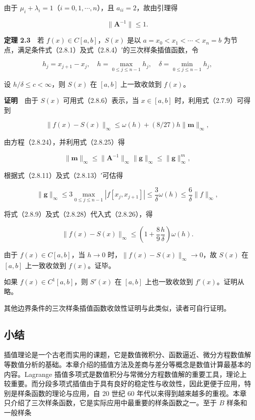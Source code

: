 \documentclass[
  10pt,
  fontset=fandol]{ctexart}
\begin{document}
由于 \(\mu_i+\lambda_i=1\)（\(i=0,1,\cdots,n\)），且 \(a_{ii}=2\)，故由引理得

\[\|\boldsymbol A^{-1}\|\leqslant1.\tag{2.8.25}\]

\textbf{定理 2.3}　若 \(f(x)\in C[a,b]\)，\(S(x)\) 是以 \(a=x_0<x_1<\cdots<x_n=b\) 为节点，满足条件式（2.8.1）及式（2.8.4）′的三次样条插值函数，令

\[h_j=x_{j+1}-x_j,\quad h=\max_{0\leqslant j\leqslant n-1}h_j,\quad\delta=\min_{0\leqslant j\leqslant n-1}h_j,\]

设 \(h/\delta\leqslant c<\infty\)，则 \(S(x)\) 在 \([a,b]\) 上一致收敛到 \(f(x)\)。

\textbf{证明}　由于 \(S(x)\) 可用式（2.8.6）表示，当 \(x\in[a,b]\) 时，利用式（2.7.9）可得到

\[\|f(x)-S(x)\|_\infty\leqslant\omega(h)+(8/27)h\|\boldsymbol m\|_\infty,\tag{2.8.26}\]

由方程（2.8.24），并利用式（2.8.25）得

\[\|\boldsymbol m\|_\infty\leqslant\|\boldsymbol A^{-1}\|_\infty\|\boldsymbol g\|_\infty\leqslant\|\boldsymbol g\|_\infty^m,\tag{2.8.27}\]

根据式（2.8.11）及式（2.8.13）′可估得

\[\|\boldsymbol g\|_\infty\leqslant3\max_{0\leqslant j\leqslant n-1}|f[x_j,x_{j+1}]|\leqslant\frac3\delta\omega(h)\leqslant\frac6\delta\|f\|_\infty,\tag{2.8.28}\]

将式（2.8.9）及式（2.8.28）代入式（2.8.26），得

\[\|f(x)-S(x)\|_\infty\leqslant\left(1+\frac89\frac h\delta\right)\omega(h).\]

由于 \(f(x)\in C[a,b]\)，当 \(h\to0\) 时，\(\|f(x)-S(x)\|_\infty\to0\)，故 \(S(x)\) 在 \([a,b]\) 上一致收敛到 \(f(x)\)。证毕。

如果 \(f(x)\in C^1[a,b]\)，则 \(S'(x)\) 在 \([a,b]\) 上也一致收敛到 \(f'(x)\)。证明从略。

其他边界条件的三次样条插值函数收敛性证明与此类似，读者可自行证明。

\subsection{小结}\label{ux5c0fux7ed3}

插值理论是一个古老而实用的课题，它是数值微积分、函数逼近、微分方程数值解等数值分析的基础。本章介绍的插值方法及差商与差分等概念是数值计算最基本的内容。Lagrange 插值多项式是数值积分与常微分方程数值解的重要工具，理论上较重要。而分段多项式插值由于具有良好的稳定性与收敛性，因此更便于应用，特别是样条函数的理论与应用，自 20 世纪 60 年代以来得到越来越多的重视。本章只介绍了三次样条函数，它是实际应用中最重要的样条函数之一。至于 \(B\) 样条和一般样条
\end{document}
